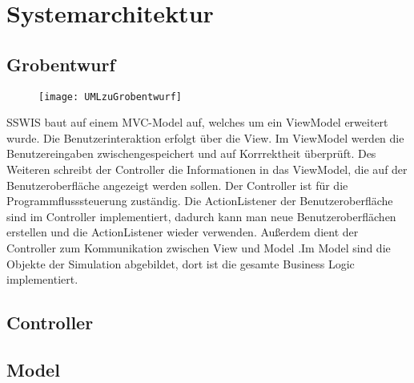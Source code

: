 \section{Systemarchitektur}

\subsection{Grobentwurf}

\begin{figure} 
  \centering
     \texttt{[image: UMLzuGrobentwurf]}
\end{figure}

SSWIS baut auf einem MVC-Model auf, welches um ein ViewModel erweitert wurde. Die Benutzerinteraktion erfolgt
über die View. Im ViewModel werden die Benutzereingaben zwischengespeichert und auf Korrrektheit überprüft. Des Weiteren schreibt der Controller die Informationen in das ViewModel, die auf der Benutzeroberfläche angezeigt werden sollen. Der Controller ist für die Programmflusssteuerung zuständig. Die ActionListener der Benutzeroberfläche sind im Controller implementiert, dadurch kann man neue Benutzeroberflächen erstellen und die ActionListener wieder verwenden. Außerdem dient der Controller zum Kommunikation zwischen View und Model .Im Model sind die Objekte der Simulation abgebildet, dort ist die gesamte Business Logic implementiert.

\subsection{Controller}

\noindent
{}


\subsection{Model}

\noindent
{}

